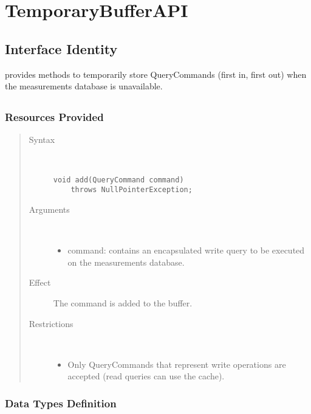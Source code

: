 \section{TemporaryBufferAPI}
\label{api:temporary-buffer-api}

\subsection{Interface Identity}

\npar {} provides methods to temporarily store 
QueryCommands (first in, first out) when the measurements database is
unavailable.

\subsection{}

\subsubsection{Resources Provided}

\begin{quote}
	\begin{description}
		\item[Syntax] \ 
		\begin{verbatim}
void add(QueryCommand command) 
    throws NullPointerException;
		\end{verbatim}
		\item[Arguments] \
		\begin{itemize}
			\item command: contains an encapsulated write query to be executed on the
			measurements database.
		\end{itemize}
		\item[Effect] The command is added to the buffer. 
		\item[Restrictions] \ 
		\begin{itemize}
			\item Only QueryCommands that represent write operations are accepted (read
			queries can use the cache). 
		\end{itemize}
	\end{description} 
\end{quote}

\subsubsection{Data Types Definition}

